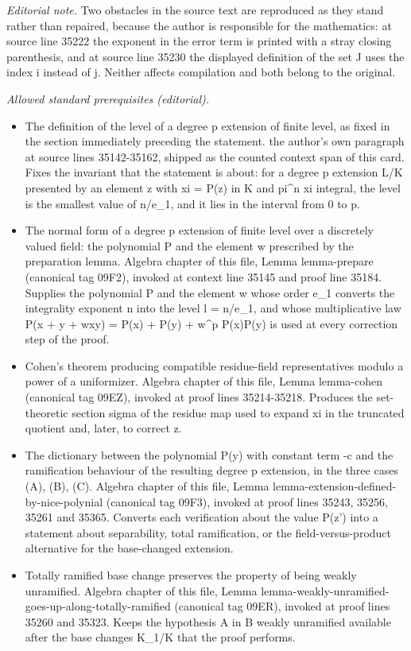 \documentclass[10pt,a4paper]{amsart}
\theoremstyle{plain}
\theoremstyle{definition}
\theoremstyle{remark}
\numberwithin{equation}{subsection}
\begin{document}
\noindent\textit{Editorial note.} Two obstacles in the source text are reproduced as they stand rather than repaired, because the author is responsible for the mathematics: at source line 35222 the exponent in the error term is printed with a stray closing parenthesis, and at source line 35230 the displayed definition of the set J uses the index i instead of j. Neither affects compilation and both belong to the original.\par\medskip
\noindent\textit{Allowed standard prerequisites (editorial).}\begin{itemize}
\item The definition of the level of a degree p extension of finite level, as fixed in the section immediately preceding the statement. the author's own paragraph at source lines 35142-35162, shipped as the counted context span of this card. Fixes the invariant that the statement is about: for a degree p extension L/K presented by an element z with xi = P(z) in K and pi\textasciicircum{}n xi integral, the level is the smallest value of n/e\_1, and it lies in the interval from 0 to p.
\item The normal form of a degree p extension of finite level over a discretely valued field: the polynomial P and the element w prescribed by the preparation lemma. Algebra chapter of this file, Lemma lemma-prepare (canonical tag 09F2), invoked at context line 35145 and proof line 35184. Supplies the polynomial P and the element w whose order e\_1 converts the integrality exponent n into the level l = n/e\_1, and whose multiplicative law P(x + y + wxy) = P(x) + P(y) + w\textasciicircum{}p P(x)P(y) is used at every correction step of the proof.
\item Cohen's theorem producing compatible residue-field representatives modulo a power of a uniformizer. Algebra chapter of this file, Lemma lemma-cohen (canonical tag 09EZ), invoked at proof lines 35214-35218. Produces the set-theoretic section sigma of the residue map used to expand xi in the truncated quotient and, later, to correct z.
\item The dictionary between the polynomial P(y) with constant term -c and the ramification behaviour of the resulting degree p extension, in the three cases (A), (B), (C). Algebra chapter of this file, Lemma lemma-extension-defined-by-nice-polynial (canonical tag 09F3), invoked at proof lines 35243, 35256, 35261 and 35365. Converts each verification about the value P(z') into a statement about separability, total ramification, or the field-versus-product alternative for the base-changed extension.
\item Totally ramified base change preserves the property of being weakly unramified. Algebra chapter of this file, Lemma lemma-weakly-unramified-goes-up-along-totally-ramified (canonical tag 09ER), invoked at proof lines 35260 and 35323. Keeps the hypothesis A in B weakly unramified available after the base changes K\_1/K that the proof performs.
\end{itemize}\medskip
\end{document}
